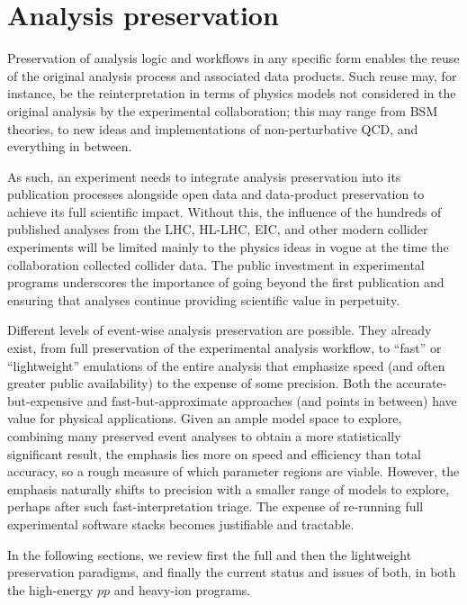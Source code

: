 \documentclass[11pt]{article}
\begin{document}
\section{Analysis preservation}
\label{sec:analysis-preservation}


Preservation of analysis logic and workflows in any specific form enables the reuse of the original analysis process and associated \glspl{data product}. Such reuse may, for instance, be the \gls{reinterpretation} in terms of physics models not considered in the original analysis by the experimental collaboration; this may range from \gls{BSM} theories, to new ideas and implementations of non-perturbative \gls{QCD}, and everything in between.

As such, an experiment needs to integrate analysis preservation into its publication processes alongside open data and data-product preservation to achieve its full scientific impact. Without this, the influence of the hundreds of published analyses from the \gls{LHC}, \gls{HL-LHC}, \gls{EIC}, and other modern collider experiments will be limited mainly to the physics ideas in vogue at the time the collaboration collected collider data. The public investment in experimental programs underscores the importance of going beyond the first publication and ensuring that analyses continue providing scientific value in perpetuity.

Different levels of event-wise analysis preservation are possible.
They already exist, from full preservation of the experimental analysis workflow, to ``fast'' or ``lightweight'' emulations of the entire analysis that emphasize speed (and often greater public availability) to the expense of some precision.
Both the accurate-but-expensive and fast-but-approximate approaches (and points in between) have value for physical applications. Given an ample model space to explore, combining many preserved event analyses to obtain a more statistically significant result, the emphasis lies more on speed and efficiency than total accuracy, so a rough measure of which parameter regions are viable.
However, the emphasis naturally shifts to precision with a smaller range of models to explore, perhaps after such fast-interpretation triage.
The expense of re-running full experimental software stacks becomes justifiable and tractable.

In the following sections, we review first the full and then the lightweight preservation paradigms, and finally the current status and issues of both, in both the high-energy $pp$ and heavy-ion programs.
\end{document}
